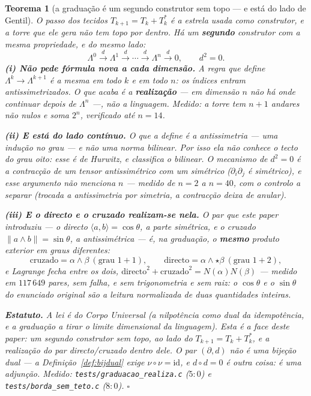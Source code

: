 \documentclass[11pt,a4paper]{article}
\newcommand{\code}[1]{\texttt{\small #1}}
\newtheorem{teorema}{Teorema}
\begin{document}
\begin{teorema}[a graduação é um segundo construtor sem topo --- e está
do lado de Gentil]\label{thm:graduacao-gentil}
O passo dos tecidos $T_{k+1}=T_k+T_k^{*}$ é a estrela usada como
construtor, e a torre que ele gera não tem topo por dentro. Há um
\textbf{segundo} construtor com a mesma propriedade, e do mesmo lado:
\[
\boxed{\;
\Lambda^{0}\xrightarrow{\;d\;}\Lambda^{1}\xrightarrow{\;d\;}\cdots
\xrightarrow{\;d\;}\Lambda^{n}\xrightarrow{\;d\;}0,
\qquad d^{2}=0.
\;}
\]
\textbf{(i) Não pede fórmula nova a cada dimensão.} A regra que define
$\Lambda^{k}\to\Lambda^{k+1}$ é a mesma em todo $k$ e em todo $n$: os
índices entram antissimetrizados. O que \emph{acaba} é a
\textbf{realização} --- em dimensão $n$ não há onde continuar depois de
$\Lambda^{n}$ ---, não a linguagem. Medido: a torre tem $n{+}1$ andares
não nulos e soma $2^{n}$, verificado até $n=14$.

\textbf{(ii) E está do lado contínuo.} O que a define é a
\emph{antissimetria} --- uma indução no grau --- e não uma norma
bilinear. Por isso ela não conhece o tecto do grau oito: esse é de
Hurwitz, e classifica o \emph{bilinear}. O mecanismo de $d^{2}=0$ é a
contracção de um tensor antissimétrico com um simétrico
($\partial_i\partial_j$ é simétrico), e esse argumento \emph{não
menciona $n$} --- medido de $n=2$ a $n=40$, com o controlo a separar
(trocada a antissimetria por simetria, a contracção deixa de anular).

\textbf{(iii) E o directo e o cruzado realizam-se nela.} O par que
este paper introduziu --- o \emph{directo} $\langle a,b\rangle=\cos\theta$,
a parte simétrica, e o \emph{cruzado} $\|a\wedge b\|=\sin\theta$, a
antissimétrica --- é, na graduação, o \textbf{mesmo} produto exterior
em graus diferentes:
\[
\text{cruzado}=\alpha\wedge\beta\ (\text{grau }1{+}1),
\qquad
\text{directo}=\alpha\wedge\star\beta\ (\text{grau }1{+}2),
\]
e Lagrange fecha entre os dois,
$\text{directo}^{2}+\text{cruzado}^{2}=N(\alpha)N(\beta)$ --- medido em
$117\,649$ pares, sem falha, e \emph{sem trigonometria e sem raiz}: o
$\cos\theta$ e o $\sin\theta$ do enunciado original são a leitura
normalizada de duas quantidades inteiras.

\textbf{Estatuto.} A lei é do \emph{Corpo Universal} (a nilpotência
como dual da idempotência, e a graduação a tirar o limite dimensional
da linguagem). Esta é a face deste paper: um segundo construtor sem
topo, ao lado do $T_{k+1}=T_k+T_k^{*}$, e a realização do par
directo/cruzado dentro dele. O par $(\partial,d)$ \emph{não} é uma
bijeção dual --- a Definição~\ref{def:bijdual} exige
$\nu\circ\nu=\mathrm{id}$, e $d\circ d=0$ é outra coisa: é uma
adjunção.
\emph{Medido:} \code{tests/graduacao\_realiza.c} ($5{:}0$) e
\code{tests/borda\_sem\_teto.c} ($8{:}0$).
$\square$
\end{teorema}
\end{document}
